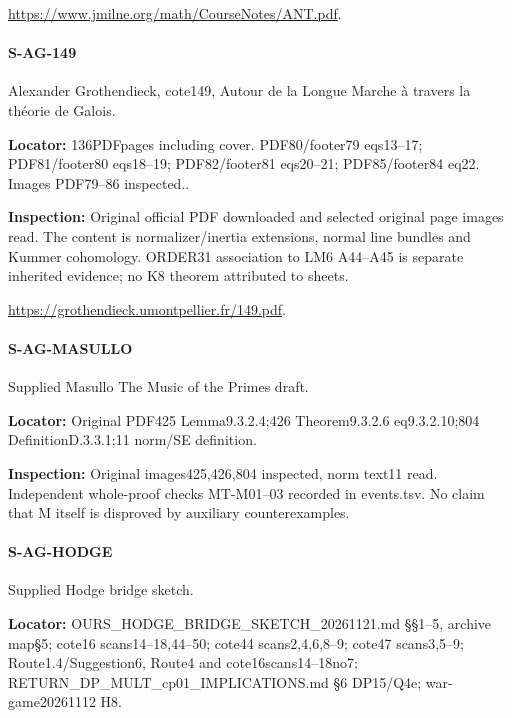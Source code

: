 \documentclass[11pt,a4paper]{article}
\begin{document}
\url{https://www.jmilne.org/math/CourseNotes/ANT.pdf}.

\paragraph{S-AG-149} Alexander Grothendieck, cote149, Autour de la Longue Marche à travers la théorie de Galois.

\textbf{Locator:} 136PDFpages including cover.\allowbreak{} PDF80/\allowbreak{}footer79 eqs13–\allowbreak{}17; PDF81/\allowbreak{}footer80 eqs18–\allowbreak{}19; PDF82/\allowbreak{}footer81 eqs20–\allowbreak{}21; PDF85/\allowbreak{}footer84 eq22.\allowbreak{} Images PDF79–\allowbreak{}86 inspected.\allowbreak{}.

\textbf{Inspection:} Original official PDF downloaded and selected original page images read.\allowbreak{} The content is normalizer/\allowbreak{}inertia extensions, normal line bundles and Kummer cohomology.\allowbreak{} ORDER31 association to LM6 A44–\allowbreak{}A45 is separate inherited evidence; no K8 theorem attributed to sheets.\allowbreak{}

\url{https://grothendieck.umontpellier.fr/149.pdf}.

\paragraph{S-AG-MASULLO} Supplied Masullo The Music of the Primes draft.

\textbf{Locator:} Original PDF425 Lemma9.\allowbreak{}3.\allowbreak{}2.\allowbreak{}4;426 Theorem9.\allowbreak{}3.\allowbreak{}2.\allowbreak{}6 eq9.\allowbreak{}3.\allowbreak{}2.\allowbreak{}10;804 DefinitionD.\allowbreak{}3.\allowbreak{}3.\allowbreak{}1;11 norm/\allowbreak{}SE definition.

\textbf{Inspection:} Original images425,426,804 inspected, norm text11 read.\allowbreak{} Independent whole-proof checks MT-M01–\allowbreak{}03 recorded in events.\allowbreak{}tsv.\allowbreak{} No claim that M itself is disproved by auxiliary counterexamples.\allowbreak{}


\paragraph{S-AG-HODGE} Supplied Hodge bridge sketch.

\textbf{Locator:} OURS\_\allowbreak{}HODGE\_\allowbreak{}BRIDGE\_\allowbreak{}SKETCH\_\allowbreak{}20261121.\allowbreak{}md §§1–\allowbreak{}5, archive map§5; cote16 scans14–\allowbreak{}18,44–\allowbreak{}50; cote44 scans2,4,6,8–\allowbreak{}9; cote47 scans3,5–\allowbreak{}9; Route1.\allowbreak{}4/\allowbreak{}Suggestion6, Route4 and cote16scans14–\allowbreak{}18no7; RETURN\_\allowbreak{}DP\_\allowbreak{}MULT\_\allowbreak{}cp01\_\allowbreak{}IMPLICATIONS.\allowbreak{}md §6 DP15/\allowbreak{}Q4e; war-game20261112 H8.
\end{document}

